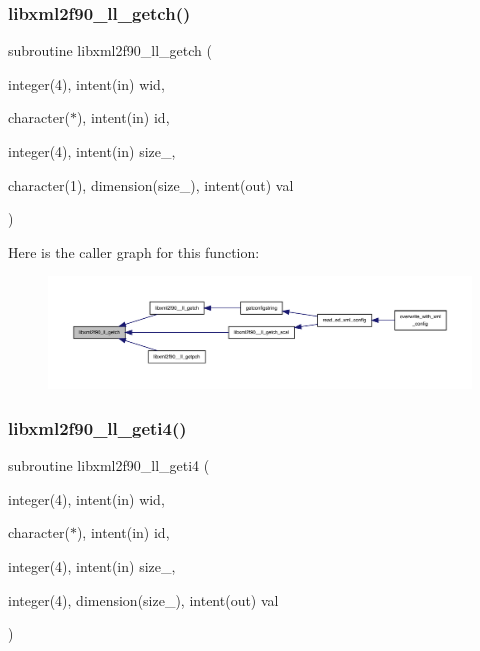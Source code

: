 \subsubsection{\texorpdfstring{libxml2f90\+\_\+ll\+\_\+getch()}{libxml2f90\_ll\_getch()}}
{\footnotesize\ttfamily subroutine libxml2f90\+\_\+ll\+\_\+getch (\begin{DoxyParamCaption}\item[{integer(4), intent(in)}]{wid,  }\item[{character($\ast$), intent(in)}]{id,  }\item[{integer(4), intent(in)}]{size\+\_\+,  }\item[{character(1), dimension(size\+\_\+), intent(out)}]{val }\end{DoxyParamCaption})}

Here is the caller graph for this function\+:
\nopagebreak
\begin{figure}[H]
\begin{center}
\leavevmode
\includegraphics[width=350pt]{libxml2f90_8f90__pp_8f90_a4f559755e5ceb6b3e6c845315d74ea7c_icgraph}
\end{center}
\end{figure}
\mbox{\label{libxml2f90_8f90__pp_8f90_a06d3fe6d9c7cd1a6044e617b8a2acdb9}} 
\subsubsection{\texorpdfstring{libxml2f90\+\_\+ll\+\_\+geti4()}{libxml2f90\_ll\_geti4()}}
{\footnotesize\ttfamily subroutine libxml2f90\+\_\+ll\+\_\+geti4 (\begin{DoxyParamCaption}\item[{integer(4), intent(in)}]{wid,  }\item[{character($\ast$), intent(in)}]{id,  }\item[{integer(4), intent(in)}]{size\+\_\+,  }\item[{integer(4), dimension(size\+\_\+), intent(out)}]{val }\end{DoxyParamCaption})}

